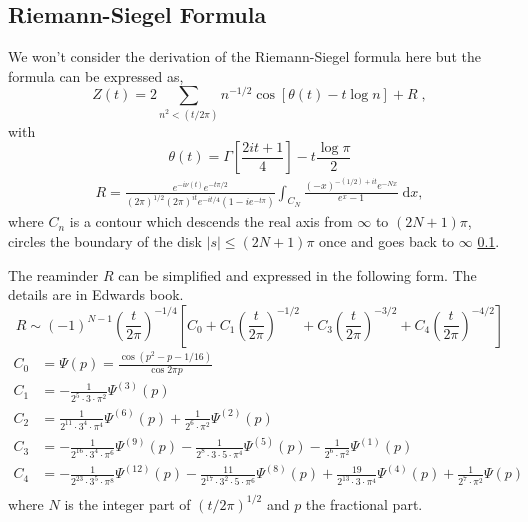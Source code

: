 \documentclass{amsproc}
\newcommand{\be}{\begin{equation}}
\newcommand{\ee}{\end{equation}}
\newcommand{\df}{\; \mathrm{d}}
\theoremstyle{definition}
\theoremstyle{remark}
\numberwithin{equation}{section}
\begin{document}
\subsection{Riemann-Siegel Formula}
We won't consider the derivation of the Riemann-Siegel formula here but the formula can be expressed as,
\be
Z(t) = 2 \sum_{n^2 < (t / 2 \pi )} n^{-1/2} \cos{ \left[ \theta(t) - t \log{n} \right] } + R \;,
\ee
with
\begin{equation}
 \theta(t) = \Gamma\left[ \frac{ 2 i t + 1}{4} \right] - t \frac{\log{\pi}}{2}
\end{equation}
\begin{align}
R = \frac{ e^{-i\nu(t)} e^{-t \pi / 2} }{ (2 \pi)^{1/2} (2 \pi)^{it} e^{-i t / 4} \left( 1 - i e^{-t \pi} \right) } \int_{C_N} \frac{ (-x)^{-(1/2) + i t}  e^{-Nx}}{ e^x - 1} \df x,
\end{align}
where $C_n$ is a contour which descends the real axis from $\infty$ to $(2 N + 1) \pi$, circles the boundary of the disk $\left| s \right| \le (2N + 1) \pi$ once and goes back to $\infty$ \ref{}.

The reaminder $R$ can be simplified and expressed in the following form. The details are in Edwards book.
\be
R \sim (-1)^{N - 1} \left( \frac{t}{2 \pi} \right)^{-1/4} \left[ C_0 + C_1 \left( \frac{t}{2\pi} \right)^{-1/2} + C_3 \left( \frac{t}{2\pi} \right)^{-3/2} + C_4 \left( \frac{t}{2\pi} \right)^{-4/2}\right]
\ee
\begin{align*}
 C_0 &= \Psi(p) = \frac{ \cos{\left( p^2 - p - 1/16 \right)} }{\cos{2 \pi p}} \\
 C_1 &= - \frac{1}{2^5 \cdot 3 \cdot \pi^2} \Psi^{(3)}(p) \\
 C_2 &=  \frac{1}{2^{11} \cdot 3^4 \cdot \pi^4} \Psi^{(6)}(p) + \frac{1}{2^6 \cdot \pi^2} \Psi^{(2)}(p)\\
 C_3 &=  - \frac{1}{2^{16} \cdot 3^4 \cdot \pi^6} \Psi^{(9)}(p) - \frac{1}{2^8 \cdot 3 \cdot 5 \cdot \pi^4} \Psi^{(5)}(p) - \frac{1}{2^6 \cdot \pi^2} \Psi^{(1)}(p) \\
 C_4 &=  - \frac{1}{2^{23} \cdot 3^5 \cdot \pi^8} \Psi^{(12)}(p) - \frac{11}{2^17 \cdot 3^2 \cdot 5 \cdot \pi^6} \Psi^{(8)}(p) + \frac{19}{2^{13} \cdot 3 \cdot \pi^4} \Psi^{(4)}(p) + \frac{1}{2^{7} \cdot \pi^2} \Psi(p) \\
\end{align*}
where $N$ is the integer part of $(t/2\pi)^{1/2}$ and $p$ the fractional part. 
\end{document}
